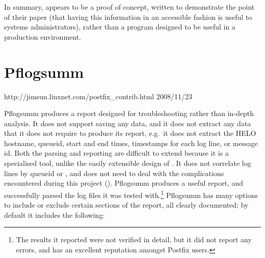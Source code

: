 In summary,  appears to be a proof of concept, written to
demonstrate the point of their paper (that having this information in an
accessible fashion is useful to systems administrators), rather than a
program designed to be useful in a production environment.

%

\section{Pflogsumm}

{http://jimsun.linxnet.com/postfix_contrib.html}
{2008/11/23}

Pflogsumm produces a report designed for troubleshooting rather than
in-depth analysis.  It does not support saving any data, and it does not
extract any data that it does not require to produce its report, e.g.\ it
does not extract the HELO hostname, queueid, start and end times,
timestamps for each log line, or message id.  Both the parsing and
reporting are difficult to extend because it is a specialised tool, unlike
the easily extensible design of \parsername{}.  It does not correlate log
lines by queueid or , and does not need to deal with the
complications encountered during this project ().
Pflogsumm produces a useful report, and successfully parsed the
\numberOFlogFILES{} log files it was tested with.\footnote{The results it
reported were not verified in detail, but it did not report any errors, and
has an excellent reputation amongst Postfix users.}  Pflogsumm has many
options to include or exclude certain sections of the report, all clearly
documented; by default it includes the following:

